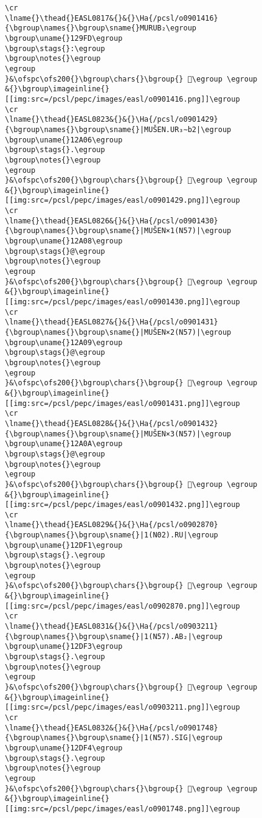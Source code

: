 \begin{verbatim}
\cr
\lname{}\thead{}EASL0817&{}&{}\Ha{/pcsl/o0901416}{\bgroup\names{}\bgroup\sname{}MURUB₂\egroup
\bgroup\uname{}129FD\egroup
\bgroup\stags{}:\egroup
\bgroup\notes{}\egroup
\egroup
}&\ofspc\ofs200{}\bgroup\chars{}\bgroup{} 𒧽\egroup \egroup
&{}\bgroup\imageinline{}[[img:src=/pcsl/pepc/images/easl/o0901416.png]]\egroup
\cr
\lname{}\thead{}EASL0823&{}&{}\Ha{/pcsl/o0901429}{\bgroup\names{}\bgroup\sname{}|MUŠEN.UR₃∼b2|\egroup
\bgroup\uname{}12A06\egroup
\bgroup\stags{}.\egroup
\bgroup\notes{}\egroup
\egroup
}&\ofspc\ofs200{}\bgroup\chars{}\bgroup{} 𒨆\egroup \egroup
&{}\bgroup\imageinline{}[[img:src=/pcsl/pepc/images/easl/o0901429.png]]\egroup
\cr
\lname{}\thead{}EASL0826&{}&{}\Ha{/pcsl/o0901430}{\bgroup\names{}\bgroup\sname{}|MUŠEN×1(N57)|\egroup
\bgroup\uname{}12A08\egroup
\bgroup\stags{}@\egroup
\bgroup\notes{}\egroup
\egroup
}&\ofspc\ofs200{}\bgroup\chars{}\bgroup{} 𒨈\egroup \egroup
&{}\bgroup\imageinline{}[[img:src=/pcsl/pepc/images/easl/o0901430.png]]\egroup
\cr
\lname{}\thead{}EASL0827&{}&{}\Ha{/pcsl/o0901431}{\bgroup\names{}\bgroup\sname{}|MUŠEN×2(N57)|\egroup
\bgroup\uname{}12A09\egroup
\bgroup\stags{}@\egroup
\bgroup\notes{}\egroup
\egroup
}&\ofspc\ofs200{}\bgroup\chars{}\bgroup{} 𒨉\egroup \egroup
&{}\bgroup\imageinline{}[[img:src=/pcsl/pepc/images/easl/o0901431.png]]\egroup
\cr
\lname{}\thead{}EASL0828&{}&{}\Ha{/pcsl/o0901432}{\bgroup\names{}\bgroup\sname{}|MUŠEN×3(N57)|\egroup
\bgroup\uname{}12A0A\egroup
\bgroup\stags{}@\egroup
\bgroup\notes{}\egroup
\egroup
}&\ofspc\ofs200{}\bgroup\chars{}\bgroup{} 𒨊\egroup \egroup
&{}\bgroup\imageinline{}[[img:src=/pcsl/pepc/images/easl/o0901432.png]]\egroup
\cr
\lname{}\thead{}EASL0829&{}&{}\Ha{/pcsl/o0902870}{\bgroup\names{}\bgroup\sname{}|1(N02).RU|\egroup
\bgroup\uname{}12DF1\egroup
\bgroup\stags{}.\egroup
\bgroup\notes{}\egroup
\egroup
}&\ofspc\ofs200{}\bgroup\chars{}\bgroup{} 𒷱\egroup \egroup
&{}\bgroup\imageinline{}[[img:src=/pcsl/pepc/images/easl/o0902870.png]]\egroup
\cr
\lname{}\thead{}EASL0831&{}&{}\Ha{/pcsl/o0903211}{\bgroup\names{}\bgroup\sname{}|1(N57).AB₂|\egroup
\bgroup\uname{}12DF3\egroup
\bgroup\stags{}.\egroup
\bgroup\notes{}\egroup
\egroup
}&\ofspc\ofs200{}\bgroup\chars{}\bgroup{} 𒷳\egroup \egroup
&{}\bgroup\imageinline{}[[img:src=/pcsl/pepc/images/easl/o0903211.png]]\egroup
\cr
\lname{}\thead{}EASL0832&{}&{}\Ha{/pcsl/o0901748}{\bgroup\names{}\bgroup\sname{}|1(N57).SIG|\egroup
\bgroup\uname{}12DF4\egroup
\bgroup\stags{}.\egroup
\bgroup\notes{}\egroup
\egroup
}&\ofspc\ofs200{}\bgroup\chars{}\bgroup{} 𒷴\egroup \egroup
&{}\bgroup\imageinline{}[[img:src=/pcsl/pepc/images/easl/o0901748.png]]\egroup

\end{verbatim}

